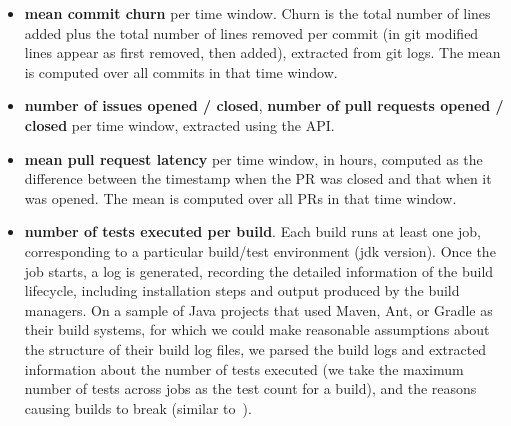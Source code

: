 \begin{itemize}

\item \textbf{mean commit churn} per time window.
Churn is the total number of lines added plus the total number
of lines removed per commit (in git modified lines appear as first removed, 
then added), extracted from git logs.
The mean is computed over all commits in that time window.

\item \textbf{number of issues opened / closed}, \textbf{number of pull requests
opened / closed} per time window, extracted using the \GH API.

\item \textbf{mean pull request latency} per time window, in hours, computed 
as the difference between the timestamp when the PR was closed and that 
when it was opened.
The mean is computed over all PRs in that time window.

\item \textbf{number of tests executed per build}. 
Each \Tvi build runs at least one job, corresponding to a particular
build/test environment (\eg jdk version). 
Once the job starts, a log is generated, recording the detailed information
of the build lifecycle, including installation steps and output produced by the 
build managers.
On a sample of Java projects that used Maven, Ant, or Gradle as their build
systems, for which we could make reasonable assumptions about the structure 
of their build log files, we parsed the \Tvi build logs and extracted information 
about the number of tests executed (we take the maximum number of tests 
across jobs as the test count for a build), and the reasons causing builds to 
break (similar to~\cite{rauschempirical}).

\end{itemize}




